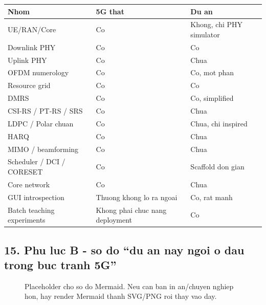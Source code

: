 \documentclass[
  vietnamese,
  a4paper,
  11pt]{article}
\newcounter{none} %
\begin{document}
{\def\LTcaptype{none} %
\begin{longtable}[]{@{}lll@{}}
\toprule\noalign{}
Nhom & 5G that & Du an \\
\midrule\noalign{}
\endhead
\bottomrule\noalign{}
\endlastfoot
UE/RAN/Core & Co & Khong, chi PHY simulator \\
Downlink PHY & Co & Co \\
Uplink PHY & Co & Chua \\
OFDM numerology & Co & Co, mot phan \\
Resource grid & Co & Co \\
DMRS & Co & Co, simplified \\
CSI-RS / PT-RS / SRS & Co & Chua \\
LDPC / Polar chuan & Co & Chua, chi inspired \\
HARQ & Co & Chua \\
MIMO / beamforming & Co & Chua \\
Scheduler / DCI / CORESET & Co & Scaffold don gian \\
Core network & Co & Chua \\
GUI introspection & Thuong khong lo ra ngoai & Co, rat manh \\
Batch teaching experiments & Khong phai chuc nang deployment & Co \\
\end{longtable}
}

\subsection{15. Phu luc B - so do ``du an nay ngoi o dau trong buc tranh
5G''}\label{phu-luc-b---so-do-du-an-nay-ngoi-o-dau-trong-buc-tranh-5g}

\begin{figure}[H]
\centering
{}
\caption{Placeholder cho so do Mermaid. Neu can ban in an/chuyen nghiep hon, hay render Mermaid thanh SVG/PNG roi thay vao day.}
\end{figure}
\end{document}
